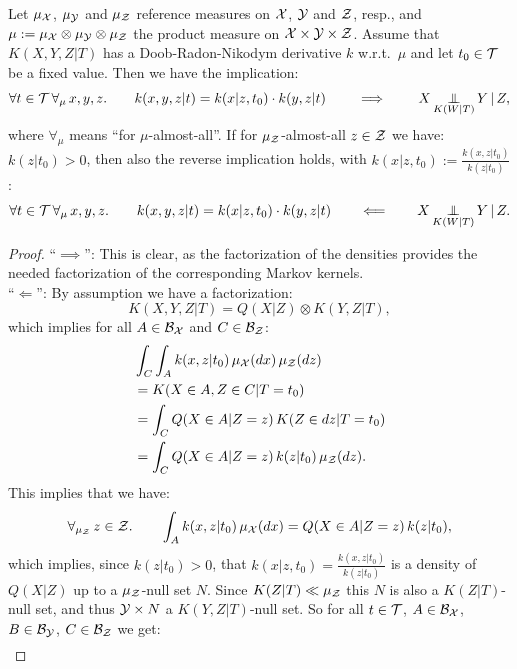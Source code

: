 \begin{Thm}
    Let $\mu_{\mathcal{X}}$, $\mu_{\mathcal{Y}}$ and $\mu_{\mathcal{Z}}$ reference measures on $\mathcal{X}$, $\mathcal{Y}$ and $\mathcal{Z}$, resp., and $\mu:=\mu_{\mathcal{X}} \otimes \mu_{\mathcal{Y}} \otimes \mu_{\mathcal{Z}}$ the product measure on
    $\mathcal{X}\times\mathcal{Y}\times\mathcal{Z}$. Assume that $K(X,Y,Z|T)$ has a Doob-Radon-Nikodym derivative $k$ w.r.t.\ $\mu$ and let $t_0 \in \mathcal{T}$ be a fixed value.
    Then we have the implication:
    \[\forall t \in \mathcal{T}\, \forall_\mu\, x,y,z. \qquad k(x,y,z|t) = k(x|z,t_0) \cdot k(y,z|t) \qquad \implies \qquad X \operatorname*{\perp\mkern-11mu\perp}_{K(W|T)} Y \operatorname*{|} Z, \]
    where $\forall_\mu$ means ``for $\mu$-almost-all''. If for $\mu_{\mathcal{Z}}$-almost-all $z \in \mathcal{Z}$ we have: $k(z|t_0)>0$, then also the reverse implication holds, with $k(x|z,t_0) := \frac{k(x,z|t_0)}{k(z|t_0)}$:
    \[\forall t \in \mathcal{T}\, \forall_\mu\, x,y,z. \qquad k(x,y,z|t) = k(x|z,t_0) \cdot k(y,z|t) \qquad \Longleftarrow \qquad X \operatorname*{\perp\mkern-11mu\perp}_{K(W|T)} Y \operatorname*{|} Z. \]
    \begin{proof}
        ``$\implies$'': This is clear, as the factorization of the densities provides the needed factorization of the corresponding Markov kernels.\\
    ``$\Longleftarrow$'': By assumption we have a factorization:
    \[ K(X,Y,Z|T) = Q(X|Z) \otimes K(Y,Z|T),  \]
    which implies for all $A \in \mathcal{B}_{\mathcal{X}}$ and $C \in \mathcal{B}_{\mathcal{Z}}$:
    \begin{align*} 
        &\int_C \int_A k(x,z|t_0) \, \mu_{\mathcal{X}}(dx)\, \mu_{\mathcal{Z}}(dz) \\
        &=  K(X \in A,Z \in C|T=t_0) \\ 
        &= \int_C Q(X \in A|Z=z)\,K(Z \in dz|T=t_0)  \\ 
        &= \int_C Q(X \in A|Z=z)\,k(z|t_0)\, \mu_{\mathcal{Z}}(dz). 
    \end{align*}
    This implies that we have:
    \begin{align*} 
        \forall_{\mu_{\mathcal{Z}}}\, z \in \mathcal{Z}.\qquad   \int_A k(x,z|t_0) \, \mu_{\mathcal{X}}(dx)  =  Q(X \in A|Z=z)\,k(z|t_0), 
    \end{align*}
    which implies, since $k(z|t_0) > 0$, that $k(x|z,t_0) = \frac{k(x,z|t_0)}{k(z|t_0)}$ is a density of $Q(X|Z)$ up to a $\mu_{\mathcal{Z}}$-null set $N$.
    Since $K(Z|T) \ll \mu_{\mathcal{Z}}$ this $N$ is also a $K(Z|T)$-null set, and thus $\mathcal{Y} \times N$ a $K(Y,Z|T)$-null set. 
    So for all $t \in \mathcal{T}$, $A \in \mathcal{B}_{\mathcal{X}}$, $B \in \mathcal{B}_{\mathcal{Y}}$, $C \in \mathcal{B}_{\mathcal{Z}}$ we get:
        \begin{align*} 

\end{align*}
\end{proof}
\end{Thm}
